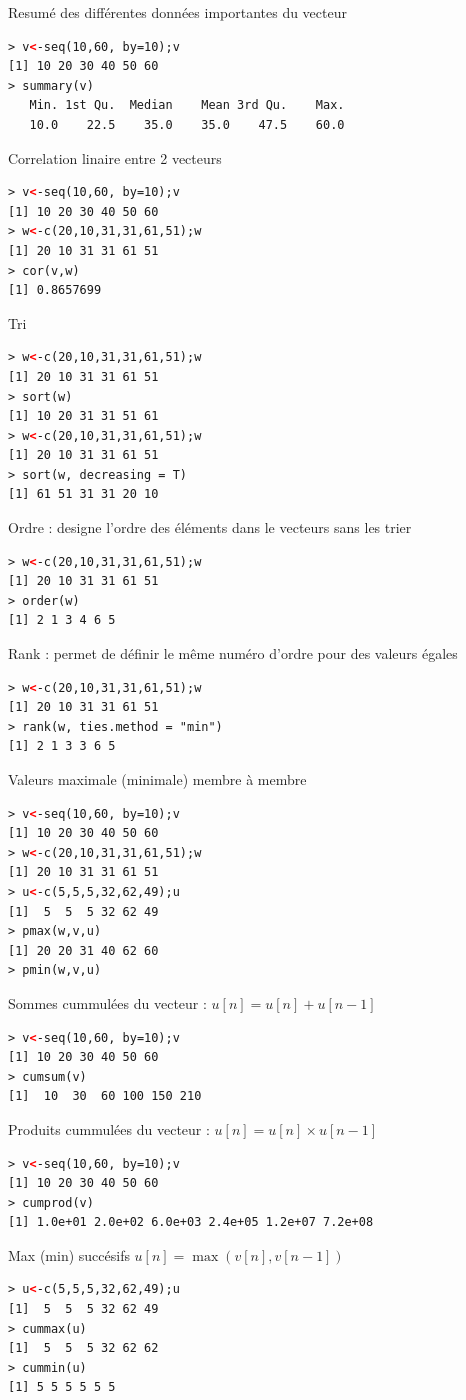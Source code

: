 Resumé des différentes données importantes du vecteur
\begin{lstlisting}[language=html]
> v<-seq(10,60, by=10);v
[1] 10 20 30 40 50 60
> summary(v)
   Min. 1st Qu.  Median    Mean 3rd Qu.    Max. 
   10.0    22.5    35.0    35.0    47.5    60.0 
\end{lstlisting}
Correlation linaire entre 2 vecteurs
\begin{lstlisting}[language=html]
> v<-seq(10,60, by=10);v
[1] 10 20 30 40 50 60
> w<-c(20,10,31,31,61,51);w
[1] 20 10 31 31 61 51
> cor(v,w)
[1] 0.8657699
\end{lstlisting}
Tri 
\begin{lstlisting}[language=html]
> w<-c(20,10,31,31,61,51);w
[1] 20 10 31 31 61 51
> sort(w)
[1] 10 20 31 31 51 61
> w<-c(20,10,31,31,61,51);w
[1] 20 10 31 31 61 51
> sort(w, decreasing = T)
[1] 61 51 31 31 20 10
\end{lstlisting}
Ordre : designe l'ordre des éléments dans le vecteurs sans les trier
\begin{lstlisting}[language=html]
> w<-c(20,10,31,31,61,51);w
[1] 20 10 31 31 61 51
> order(w)
[1] 2 1 3 4 6 5
\end{lstlisting}
Rank : permet de définir le même numéro d'ordre pour des valeurs égales 
\begin{lstlisting}[language=html]
> w<-c(20,10,31,31,61,51);w
[1] 20 10 31 31 61 51
> rank(w, ties.method = "min")
[1] 2 1 3 3 6 5
\end{lstlisting}

Valeurs maximale (minimale) membre à membre
\begin{lstlisting}[language=html]
> v<-seq(10,60, by=10);v
[1] 10 20 30 40 50 60
> w<-c(20,10,31,31,61,51);w
[1] 20 10 31 31 61 51
> u<-c(5,5,5,32,62,49);u
[1]  5  5  5 32 62 49
> pmax(w,v,u)
[1] 20 20 31 40 62 60
> pmin(w,v,u)
\end{lstlisting}

Sommes cummulées du vecteur : $u[n] = u[n]+u[n-1]$
\begin{lstlisting}[language=html]
> v<-seq(10,60, by=10);v
[1] 10 20 30 40 50 60
> cumsum(v)
[1]  10  30  60 100 150 210
\end{lstlisting}
Produits cummulées du vecteur : $u[n]=u[n] \times u[n-1]$
\begin{lstlisting}[language=html]
> v<-seq(10,60, by=10);v
[1] 10 20 30 40 50 60
> cumprod(v)
[1] 1.0e+01 2.0e+02 6.0e+03 2.4e+05 1.2e+07 7.2e+08
\end{lstlisting}

Max (min) succésifs $u[n] = \max(v[n],v[n-1])$
\begin{lstlisting}[language=html]
> u<-c(5,5,5,32,62,49);u
[1]  5  5  5 32 62 49
> cummax(u)
[1]  5  5  5 32 62 62
> cummin(u)
[1] 5 5 5 5 5 5
\end{lstlisting}


